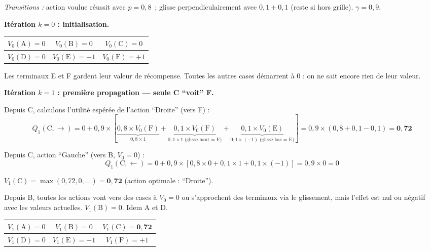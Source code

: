 \documentclass[11pt,a4paper]{article}
\begin{document}
\textit{Transitions :} action voulue réussit avec $p=0{,}8$~; glisse perpendiculairement avec $0{,}1+0{,}1$ (reste si hors grille). $\gamma=0{,}9$.

\bigskip
\textbf{Itération $k=0$ : initialisation.}

\begin{center}
\begin{tabular}{|c|c|c|}
\hline
$V_0(\text{A})=0$ & $V_0(\text{B})=0$ & $V_0(\text{C})=0$ \\
\hline
$V_0(\text{D})=0$ & $V_0(\text{E})=-1$ & $V_0(\text{F})=+1$ \\
\hline
\end{tabular}
\end{center}

Les terminaux E et F gardent leur valeur de récompense. Toutes les autres cases démarrent à 0 : on ne sait encore rien de leur valeur.

\bigskip
\textbf{Itération $k=1$ : première propagation --- seule C ``voit'' F.}

Depuis C, calculons l'utilité espérée de l'action ``Droite'' (vers F) :
$$Q_1(\text{C}, \rightarrow) = 0 + 0{,}9 \times [\underbrace{0{,}8 \times V_0(\text{F})}_{0{,}8 \times 1}
+ \underbrace{0{,}1 \times V_0(\text{F})}_{0{,}1 \times 1 \;\text{(glisse haut = F)}}
+ \underbrace{0{,}1 \times V_0(\text{E})}_{0{,}1 \times (-1)\;\text{(glisse bas = E)}}] = 0{,}9\times(0{,}8+0{,}1-0{,}1) = \mathbf{0{,}72}$$

Depuis C, action ``Gauche'' (vers B, $V_0=0$) :
$$Q_1(\text{C}, \leftarrow) = 0 + 0{,}9 \times [0{,}8 \times 0 + 0{,}1 \times 1 + 0{,}1 \times(-1)] = 0{,}9 \times 0 = 0$$

$V_1(\text{C}) = \max(0{,}72, 0, \ldots) = \mathbf{0{,}72}$ \quad (action optimale : ``Droite'').

Depuis B, toutes les actions vont vers des cases à $V_0=0$ ou s'approchent des terminaux via le glissement, mais l'effet est nul ou négatif avec les valeurs actuelles. $V_1(\text{B})=0$. Idem A et D.

\begin{center}
\begin{tabular}{|c|c|c|}
\hline
$V_1(\text{A})=0$ & $V_1(\text{B})=0$ & $V_1(\text{C})=\mathbf{0{,}72}$ \\
\hline
$V_1(\text{D})=0$ & $V_1(\text{E})=-1$ & $V_1(\text{F})=+1$ \\
\hline
\end{tabular}
\end{center}
\end{document}

